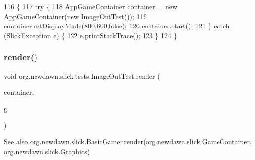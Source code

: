 \begin{DoxyCode}
116                                            \{
117         \textcolor{keywordflow}{try} \{
118             AppGameContainer \mbox{\hyperlink{classorg_1_1newdawn_1_1slick_1_1tests_1_1_image_out_test_a09db11b63df42087043028eceef5d69a}{container}} = \textcolor{keyword}{new} AppGameContainer(\textcolor{keyword}{new} 
      \mbox{\hyperlink{classorg_1_1newdawn_1_1slick_1_1tests_1_1_image_out_test_a270f7938a765d916248533df619a3191}{ImageOutTest}}());
119             \mbox{\hyperlink{classorg_1_1newdawn_1_1slick_1_1tests_1_1_image_out_test_a09db11b63df42087043028eceef5d69a}{container}}.setDisplayMode(800,600,\textcolor{keyword}{false});
120             \mbox{\hyperlink{classorg_1_1newdawn_1_1slick_1_1tests_1_1_image_out_test_a09db11b63df42087043028eceef5d69a}{container}}.start();
121         \} \textcolor{keywordflow}{catch} (SlickException e) \{
122             e.printStackTrace();
123         \}
124     \}
\end{DoxyCode}
\mbox{\label{classorg_1_1newdawn_1_1slick_1_1tests_1_1_image_out_test_a295298e572c7b97f530d2bdce659b9c6}} 
\subsubsection{\texorpdfstring{render()}{render()}}
{\footnotesize\ttfamily void org.\+newdawn.\+slick.\+tests.\+Image\+Out\+Test.\+render (\begin{DoxyParamCaption}\item[{\mbox{\hyperlink{classorg_1_1newdawn_1_1slick_1_1_game_container}{Game\+Container}}}]{container,  }\item[{\mbox{\hyperlink{classorg_1_1newdawn_1_1slick_1_1_graphics}{Graphics}}}]{g }\end{DoxyParamCaption})\hspace{0.3cm}{\ttfamily [inline]}}

\begin{DoxySeeAlso}{See also}
\mbox{\hyperlink{interfaceorg_1_1newdawn_1_1slick_1_1_game_af1a4670d43eb3ba04dfcf55ab1975b64}{org.\+newdawn.\+slick.\+Basic\+Game\+::render}}(\mbox{\hyperlink{classorg_1_1newdawn_1_1slick_1_1_game_container}{org.\+newdawn.\+slick.\+Game\+Container}}, \mbox{\hyperlink{classorg_1_1newdawn_1_1slick_1_1_graphics}{org.\+newdawn.\+slick.\+Graphics}}) 
\end{DoxySeeAlso}


